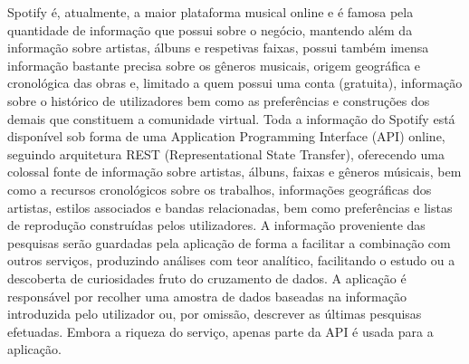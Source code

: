 \documentclass[twocolumn,twoside,11pt,a4paper]{article}
\begin{document}
Spotify é, atualmente, a maior plataforma musical online e é famosa pela quantidade de
informação que possui sobre o negócio, mantendo além da informação sobre artistas, álbuns e
respetivas faixas, possui também imensa informação bastante precisa sobre os gêneros musicais,
origem geográfica e cronológica das obras e, limitado a quem possui uma conta (gratuita),
informação sobre o histórico de utilizadores bem como as preferências e construções dos
demais que constituem a comunidade virtual.
Toda a informação do Spotify está disponível sob forma de uma Application Programming Interface
(API) online, seguindo arquitetura REST (Representational State Transfer), oferecendo uma
colossal fonte de informação sobre artistas, álbuns, faixas e gêneros músicais, bem como a
recursos cronológicos sobre os trabalhos, informações geográficas dos artistas, estilos
associados e bandas relacionadas, bem como preferências e listas de reprodução construídas
pelos utilizadores.
A informação proveniente das pesquisas serão guardadas pela aplicação de forma a facilitar a
combinação com outros serviços, produzindo análises com teor analítico, facilitando o estudo
ou a descoberta de curiosidades fruto do cruzamento de dados.
A aplicação é responsável por recolher uma amostra de dados baseadas na informação
introduzida pelo utilizador ou, por omissão, descrever as últimas pesquisas efetuadas.
Embora a riqueza do serviço, apenas parte da API é usada para a aplicação.


%

\end{document}
